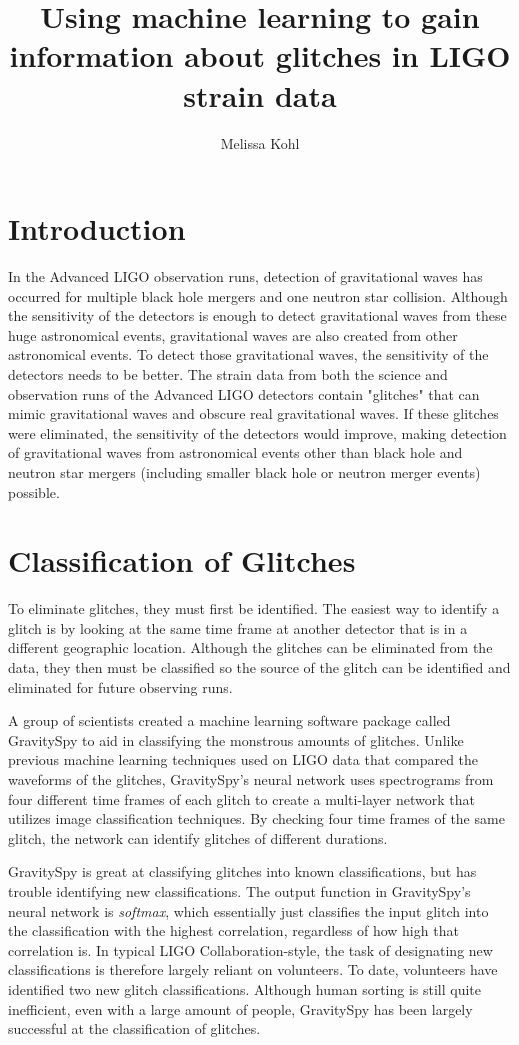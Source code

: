 \documentclass[a4paper]{article}
\title{Using machine learning to gain information about glitches in LIGO strain data}
\author{Melissa Kohl}
\begin{document}
\maketitle

\section{Introduction}

In the Advanced LIGO observation runs, detection of gravitational waves has occurred for multiple black hole mergers and one neutron star collision. Although the sensitivity of the detectors is enough to detect gravitational waves from these huge astronomical events, gravitational waves are also created from other astronomical events. To detect those gravitational waves, the sensitivity of the detectors needs to be better. The strain data from both the science and observation runs of the Advanced LIGO detectors contain "glitches" that can mimic gravitational waves and obscure real gravitational waves. If these glitches were eliminated, the sensitivity of the detectors would improve, making detection of gravitational waves from astronomical events other than black hole and neutron star mergers (including smaller black hole or neutron merger events) possible. 

\section{Classification of Glitches}

To eliminate glitches, they must first be identified. The easiest way to identify a glitch is by looking at the same time frame at another detector that is in a different geographic location. Although the glitches can be eliminated from the data, they then must be classified so the source of the glitch can be identified and eliminated for future observing runs. 

A group of scientists created a machine learning software package called GravitySpy to aid in classifying the monstrous amounts of glitches. Unlike previous machine learning techniques used on LIGO data that compared the waveforms of the glitches, GravitySpy's neural network uses spectrograms from four different time frames of each glitch to create a multi-layer network that utilizes image classification techniques. By checking four time frames of the same glitch, the network can identify glitches of different durations. 

GravitySpy is great at classifying glitches into known classifications, but has trouble identifying new classifications. The output function in GravitySpy's neural network is \textit{softmax}, which essentially just classifies the input glitch into the classification with the highest correlation, regardless of how high that correlation is. In typical LIGO Collaboration-style, the task of designating new classifications is therefore largely reliant on volunteers. To date, volunteers have identified two new glitch classifications. Although human sorting is still quite inefficient, even with a large amount of people, GravitySpy has been largely successful at the classification of glitches.
\end{document}
